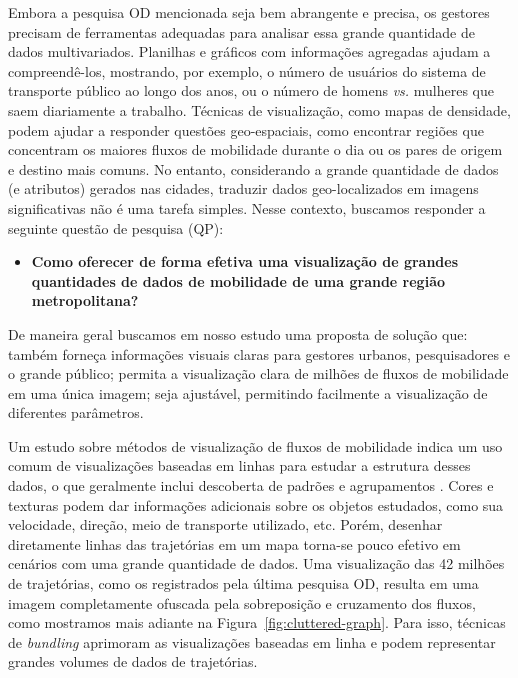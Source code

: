 Embora a pesquisa OD mencionada seja bem abrangente e precisa, 
os gestores precisam de ferramentas adequadas para analisar essa grande quantidade de
dados multivariados. Planilhas e gráficos com informações agregadas
ajudam a compreendê-los, mostrando, por exemplo, o número de usuários 
do sistema de transporte público ao longo dos anos, ou o número de homens \emph{vs.} mulheres
que saem diariamente a trabalho. Técnicas de visualização, como mapas de densidade,
podem ajudar a responder questões geo-espaciais, como encontrar regiões que concentram
os maiores fluxos de mobilidade durante o dia ou os pares de origem e destino
mais comuns. No entanto, considerando a grande quantidade de dados (e atributos) gerados
nas cidades, traduzir dados geo-localizados em imagens significativas não é uma tarefa simples.
Nesse contexto, buscamos responder a seguinte questão de pesquisa (QP):

\begin{itemize}
  \item \textbf{Como oferecer de forma efetiva uma visualização de grandes quantidades de
dados de mobilidade de uma grande região metropolitana?}
\end{itemize}

De maneira geral buscamos em nosso estudo uma proposta de solução que: também
forneça informações visuais claras para gestores urbanos, pesquisadores e o
grande público; permita a visualização clara de milhões de fluxos de mobilidade
em uma única imagem; seja ajustável, permitindo facilmente a visualização de
diferentes parâmetros.

Um estudo sobre métodos de visualização de fluxos de mobilidade indica
um uso comum de visualizações baseadas em linhas para estudar a estrutura desses
dados, o que geralmente inclui descoberta de padrões e agrupamentos
\citep{Chen2015}. Cores e texturas podem dar informações
adicionais sobre os objetos estudados, como sua velocidade, direção, meio de
transporte utilizado, etc. Porém, desenhar diretamente linhas das trajetórias em
um mapa torna-se pouco efetivo em cenários com uma grande quantidade de dados.
Uma visualização das 42 milhões de trajetórias, como os registrados pela última
pesquisa OD, resulta em uma imagem completamente ofuscada pela sobreposição e
cruzamento dos fluxos, como mostramos mais adiante na
Figura~\ref{fig:cluttered-graph}. Para isso, técnicas de \emph{bundling}
aprimoram as visualizações baseadas em linha e podem representar grandes volumes
de dados de trajetórias.

